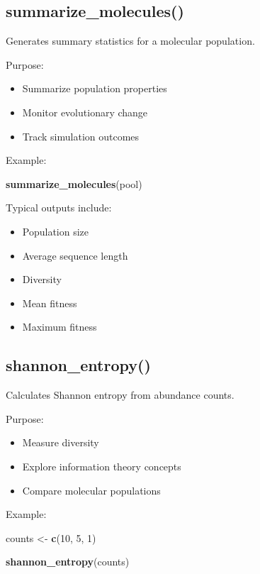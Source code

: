\documentclass[
  oneside,
  openany]{book}
\newenvironment{Shaded}{\begin{snugshade}}{\end{snugshade}}
\newcommand{\DecValTok}[1]{\textcolor[rgb]{0.00,0.00,0.81}{#1}}
\newcommand{\FunctionTok}[1]{\textcolor[rgb]{0.13,0.29,0.53}{\textbf{#1}}}
\newcommand{\NormalTok}[1]{#1}
\newcommand{\OtherTok}[1]{\textcolor[rgb]{0.56,0.35,0.01}{#1}}
\providecommand{\tightlist}{%
  \setlength{\itemsep}{0pt}\setlength{\parskip}{0pt}}
\begin{document}
\subsection{summarize\_molecules()}\label{summarize_molecules}

Generates summary statistics for a molecular population.

Purpose:

\begin{itemize}
\tightlist
\item
  Summarize population properties
\item
  Monitor evolutionary change
\item
  Track simulation outcomes
\end{itemize}

Example:

\begin{Shaded}
\begin{Highlighting}[]
\FunctionTok{summarize\_molecules}\NormalTok{(pool)}
\end{Highlighting}
\end{Shaded}

Typical outputs include:

\begin{itemize}
\tightlist
\item
  Population size
\item
  Average sequence length
\item
  Diversity
\item
  Mean fitness
\item
  Maximum fitness
\end{itemize}

\subsection{shannon\_entropy()}\label{shannon_entropy}

Calculates Shannon entropy from abundance counts.

Purpose:

\begin{itemize}
\tightlist
\item
  Measure diversity
\item
  Explore information theory concepts
\item
  Compare molecular populations
\end{itemize}

Example:

\begin{Shaded}
\begin{Highlighting}[]
\NormalTok{counts }\OtherTok{\textless{}{-}} \FunctionTok{c}\NormalTok{(}\DecValTok{10}\NormalTok{, }\DecValTok{5}\NormalTok{, }\DecValTok{1}\NormalTok{)}

\FunctionTok{shannon\_entropy}\NormalTok{(counts)}
\end{Highlighting}
\end{Shaded}
\end{document}
